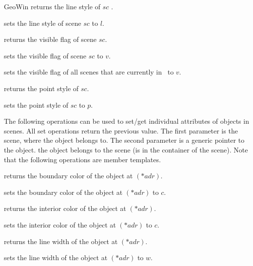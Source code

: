 \begin{ccRefClass}{GeoWin}
{returns the line style of $sc$ .}
  
{sets the line style of scene $sc$ to $l$.}

{returns the visible flag of scene $sc$. }
  
{sets the visible flag of scene $sc$ to $v$. }

{sets the visible flag of all scenes that are currently in \ccVar\ to $v$.}
  
{returns the point style of $sc$.}
  
{sets the point style of $sc$ to $p$.}

\begin{ccAdvanced}

\medskip
{The following operations can be used to set/get 
individual attributes of objects in scenes.
All set operations return the previous value.
The first parameter is the scene, where the object belongs to.
The second parameter is a generic pointer to the object.
\ccPrecond the object belongs to the scene (is in the container
of the scene).
Note that the following operations are member templates. 
}

{returns the boundary color of the object at $(*adr)$.}

{sets the boundary color of the object at $(*adr)$ to $c$.}  

{returns the interior color of the object at $(*adr)$.}

{sets the interior color of the object at $(*adr)$ to $c$.}   

{returns the line width of the object at $(*adr)$.} 

{sets the line width of the object at $(*adr)$ to $w$.}


\end{ccAdvanced}
\end{ccRefClass}
